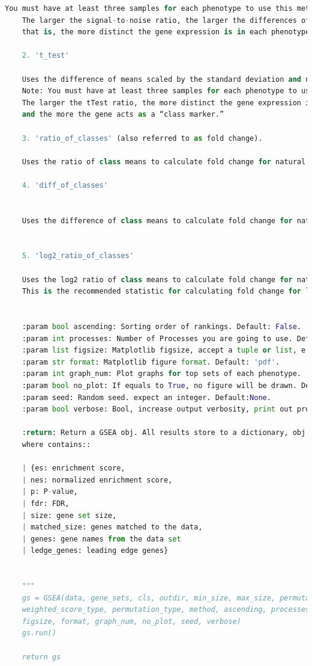\documentclass{article}
\begin{document}
\begin{appendices}
\begin{lstlisting}[language=Python, caption={Sample that ranked first},captionpos=b]
    You must have at least three samples for each phenotype to use this metric.
    The larger the signal-to-noise ratio, the larger the differences of the means (scaled by the standard deviations);
    that is, the more distinct the gene expression is in each phenotype and the more the gene acts as a “class marker.”
    
    2. 't_test'
    
    Uses the difference of means scaled by the standard deviation and number of samples.
    Note: You must have at least three samples for each phenotype to use this metric.
    The larger the tTest ratio, the more distinct the gene expression is in each phenotype
    and the more the gene acts as a “class marker.”
    
    3. 'ratio_of_classes' (also referred to as fold change).
    
    Uses the ratio of class means to calculate fold change for natural scale data.
    
    4. 'diff_of_classes'
    
    
    Uses the difference of class means to calculate fold change for nature scale data
    
    
    5. 'log2_ratio_of_classes'
    
    Uses the log2 ratio of class means to calculate fold change for natural scale data.
    This is the recommended statistic for calculating fold change for log scale data.
    
    
    :param bool ascending: Sorting order of rankings. Default: False.
    :param int processes: Number of Processes you are going to use. Default: 1.
    :param list figsize: Matplotlib figsize, accept a tuple or list, e.g. [width,height]. Default: [6.5,6].
    :param str format: Matplotlib figure format. Default: 'pdf'.
    :param int graph_num: Plot graphs for top sets of each phenotype.
    :param bool no_plot: If equals to True, no figure will be drawn. Default: False.
    :param seed: Random seed. expect an integer. Default:None.
    :param bool verbose: Bool, increase output verbosity, print out progress of your job, Default: False.
    
    :return: Return a GSEA obj. All results store to a dictionary, obj.results,
    where contains::
    
    | {es: enrichment score,
    | nes: normalized enrichment score,
    | p: P-value,
    | fdr: FDR,
    | size: gene set size,
    | matched_size: genes matched to the data,
    | genes: gene names from the data set
    | ledge_genes: leading edge genes}
    
    
    """
    gs = GSEA(data, gene_sets, cls, outdir, min_size, max_size, permutation_num,
    weighted_score_type, permutation_type, method, ascending, processes,
    figsize, format, graph_num, no_plot, seed, verbose)
    gs.run()
    
    return gs

\end{lstlisting}

\end{appendices}
\end{document}
